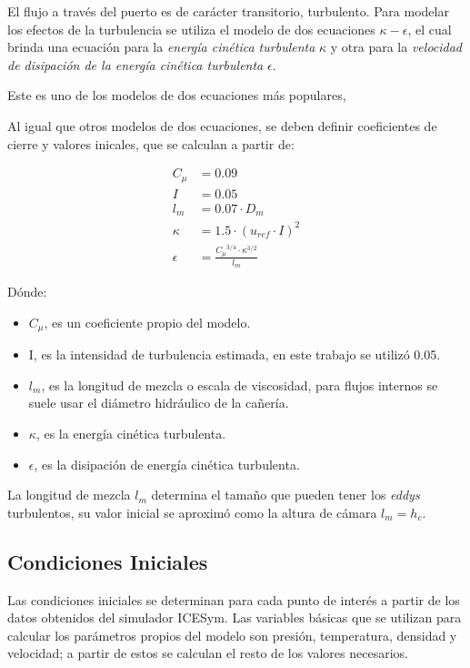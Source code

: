 El flujo a través del puerto es de carácter transitorio, turbulento.
%
Para modelar los efectos de la turbulencia se utiliza el modelo de dos
ecuaciones \emph{$\kappa-\epsilon$}, el cual brinda una ecuación para la
\emph{energía cinética turbulenta} $\kappa$ y otra para la \emph{velocidad de
disipación de la energía cinética turbulenta} $\epsilon$.
%

Este es uno de los modelos de dos ecuaciones más populares,

Al igual que otros modelos de dos ecuaciones, se deben definir coeficientes de
cierre y valores inicales, que se calculan a partir de:

\begin{align}
  C_{\mu} &= 0.09 \\
  I &= 0.05 \\
  l_{m} &= 0.07 \cdot D_{m} \\
  \kappa &= 1.5 \cdot {\left( u_{ref} \cdot I \right)}^{2}\\
  \epsilon &= \frac{{C_{\mu}}^{3/4} \cdot {\kappa}^{3/2}} {l_{m}}
\end{align}

Dónde:
%
\begin{itemize}

    \item $C_{\mu}$, es un coeficiente propio del modelo.
    \item I, es la intensidad de turbulencia estimada, en este trabajo se utilizó 0.05.
    \item $l_m$, es la longitud de mezcla o escala de viscosidad,
     para flujos internos se suele usar el diámetro hidráulico de la cañería.
    \item $\kappa$, es la energía cinética turbulenta.
    \item $\epsilon$, es la disipación de energía cinética turbulenta.
\end{itemize}

La longitud de mezcla $l_m$ determina el tamaño que pueden tener los \emph{eddys}
turbulentos, su valor inicial se aproximó como la altura de cámara $l_m = h_c$.


\subsection{Condiciones Iniciales}
%
Las condiciones iniciales se determinan para cada punto de interés a partir de
los datos obtenidos del simulador ICESym.
%
Las variables básicas que se utilizan para calcular los parámetros propios del
modelo son presión, temperatura, densidad y velocidad; a partir de estos se
calculan el resto de los valores necesarios.
%

